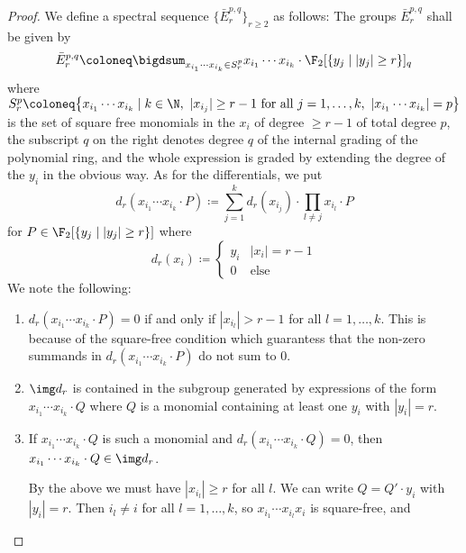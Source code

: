 \begin{proof}
	We define a spectral sequence $\{\bar{E}_r^{p, q}\}_{r \geq 2}$ as follows:
	The groups $\bar{E}_r^{p, q}$ shall be given by
	\begin{equation*}
		\bar{E}_r^{p, q} \coloneq \bigdsum_{x_{i_1} \cdots x_{i_k} \in S^p_r} x_{i_1} \cdots x_{i_k} \cdot \F_2[\{y_j \mid |y_j| \geq r\}]_q
	\end{equation*}
	where $S^p_r \coloneq \big\{x_{i_1} \cdots x_{i_k} \mid k \in \N,\ |x_{i_j}| \geq r - 1 \text{ for all } j = 1, \ldots, k,\ |x_{i_1} \cdots x_{i_k}| = p\big\}$ is the set of square free monomials in the $x_i$ of degree $\geq r - 1$ of total degree $p$, the subscript $q$ on the right denotes degree $q$ of the internal grading of the polynomial ring, and the whole expression is graded by extending the degree of the $y_i$ in the obvious way.
	As for the differentials, we put
	\begin{equation*}
		d_r(x_{i_1} \cdots x_{i_k} \cdot P) \coloneq \sum_{j = 1}^k d_r(x_{i_j}) \cdot \prod_{l \neq j} x_{i_l} \cdot P
	\end{equation*}
	for $P \in \F_2[\{y_j \mid |y_j| \geq r\}]$ where
	\begin{equation*}
		d_r(x_i) \coloneq \begin{cases}
			y_i & |x_i| = r - 1 \\
			0 	& \text{else}
		\end{cases}
	\end{equation*}
	We note the following:
	\begin{enumerate}
		\item $d_r(x_{i_1} \cdots x_{i_k} \cdot P) = 0$ if and only if $|x_{i_l}| > r - 1$ for all $l = 1, \ldots, k$.
			This is because of the square-free condition which guarantess that the non-zero summands in $d_r(x_{i_1} \cdots x_{i_k} \cdot P)$ do not sum to 0.
		\item $\img d_r$ is contained in the subgroup generated by expressions of the form $x_{i_1} \cdots x_{i_k} \cdot Q$ where $Q$ is a monomial containing at least one $y_i$ with $|y_i| = r$.
		\item If $x_{i_1} \cdots x_{i_k} \cdot Q$ is such a monomial and $d_r(x_{i_1} \cdots x_{i_k} \cdot Q) = 0$, then $x_{i_1} \cdots x_{i_k} \cdot Q \in \img d_r$.
			\begin{smallproof}
				By the above we must have $|x_{i_l}| \geq r$ for all $l$.
				We can write $Q = Q' \cdot y_i$ with $|y_i| = r$.
				Then $i_l \neq i$ for all $l = 1, \ldots, k$, so $x_{i_1} \cdots x_{i_l} x_i$ is square-free, and

\end{smallproof}
\end{enumerate}
\end{proof}
